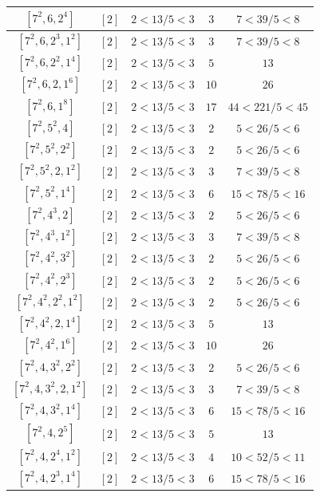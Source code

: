 \documentclass{article}%
\begin{document}
\begin{center}
\begin{longtable}{||c|c|c|c|c||}
$[7^{2}, 6, 2^{4}]$ & $[2]$ & $2 < 13/5 < 3$ & $3$ & $7 < 39/5 < 8$ \\ \hline 
$[7^{2}, 6, 2^{3}, 1^{2}]$ & $[2]$ & $2 < 13/5 < 3$ & $3$ & $7 < 39/5 < 8$ \\ \hline 
$[7^{2}, 6, 2^{2}, 1^{4}]$ & $[2]$ & $2 < 13/5 < 3$ & $5$ & $13$ \\ \hline 
$[7^{2}, 6, 2, 1^{6}]$ & $[2]$ & $2 < 13/5 < 3$ & $10$ & $26$ \\ \hline 
$[7^{2}, 6, 1^{8}]$ & $[2]$ & $2 < 13/5 < 3$ & $17$ & $44 < 221/5 < 45$ \\ \hline 
$[7^{2}, 5^{2}, 4]$ & $[2]$ & $2 < 13/5 < 3$ & $2$ & $5 < 26/5 < 6$ \\ \hline 
$[7^{2}, 5^{2}, 2^{2}]$ & $[2]$ & $2 < 13/5 < 3$ & $2$ & $5 < 26/5 < 6$ \\ \hline 
$[7^{2}, 5^{2}, 2, 1^{2}]$ & $[2]$ & $2 < 13/5 < 3$ & $3$ & $7 < 39/5 < 8$ \\ \hline 
$[7^{2}, 5^{2}, 1^{4}]$ & $[2]$ & $2 < 13/5 < 3$ & $6$ & $15 < 78/5 < 16$ \\ \hline 
$[7^{2}, 4^{3}, 2]$ & $[2]$ & $2 < 13/5 < 3$ & $2$ & $5 < 26/5 < 6$ \\ \hline 
$[7^{2}, 4^{3}, 1^{2}]$ & $[2]$ & $2 < 13/5 < 3$ & $3$ & $7 < 39/5 < 8$ \\ \hline 
$[7^{2}, 4^{2}, 3^{2}]$ & $[2]$ & $2 < 13/5 < 3$ & $2$ & $5 < 26/5 < 6$ \\ \hline 
$[7^{2}, 4^{2}, 2^{3}]$ & $[2]$ & $2 < 13/5 < 3$ & $2$ & $5 < 26/5 < 6$ \\ \hline 
$[7^{2}, 4^{2}, 2^{2}, 1^{2}]$ & $[2]$ & $2 < 13/5 < 3$ & $2$ & $5 < 26/5 < 6$ \\ \hline 
$[7^{2}, 4^{2}, 2, 1^{4}]$ & $[2]$ & $2 < 13/5 < 3$ & $5$ & $13$ \\ \hline 
$[7^{2}, 4^{2}, 1^{6}]$ & $[2]$ & $2 < 13/5 < 3$ & $10$ & $26$ \\ \hline 
$[7^{2}, 4, 3^{2}, 2^{2}]$ & $[2]$ & $2 < 13/5 < 3$ & $2$ & $5 < 26/5 < 6$ \\ \hline 
$[7^{2}, 4, 3^{2}, 2, 1^{2}]$ & $[2]$ & $2 < 13/5 < 3$ & $3$ & $7 < 39/5 < 8$ \\ \hline 
$[7^{2}, 4, 3^{2}, 1^{4}]$ & $[2]$ & $2 < 13/5 < 3$ & $6$ & $15 < 78/5 < 16$ \\ \hline 
$[7^{2}, 4, 2^{5}]$ & $[2]$ & $2 < 13/5 < 3$ & $5$ & $13$ \\ \hline 
$[7^{2}, 4, 2^{4}, 1^{2}]$ & $[2]$ & $2 < 13/5 < 3$ & $4$ & $10 < 52/5 < 11$ \\ \hline 
$[7^{2}, 4, 2^{3}, 1^{4}]$ & $[2]$ & $2 < 13/5 < 3$ & $6$ & $15 < 78/5 < 16$ \\ \hline 

\end{longtable}
\end{center}
\end{document}
